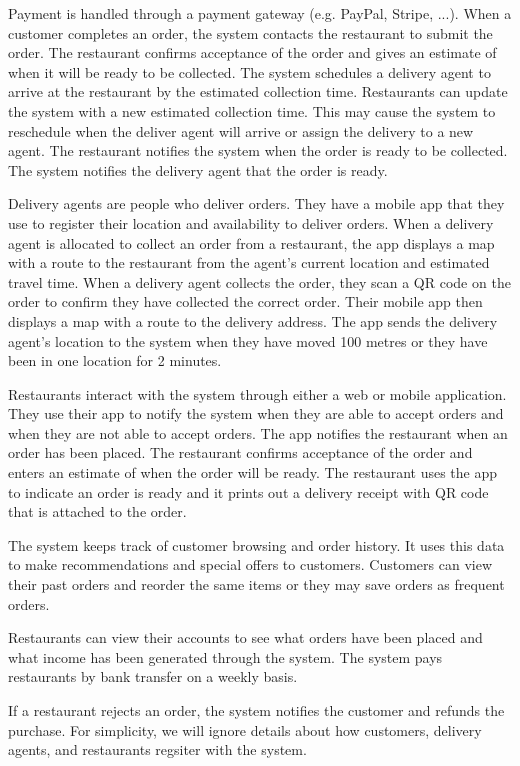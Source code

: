 \documentclass{csse4400}
\begin{document}
Payment is handled through a payment gateway (e.g. PayPal, Stripe, ...).
When a customer completes an order, the system contacts the restaurant to submit the order.
The restaurant confirms acceptance of the order and gives an estimate of when it will be ready to be collected.
The system schedules a delivery agent to arrive at the restaurant by the estimated collection time.
Restaurants can update the system with a new estimated collection time.
This may cause the system to reschedule when the deliver agent will arrive or assign the delivery to a new agent.
The restaurant notifies the system when the order is ready to be collected.
The system notifies the delivery agent that the order is ready.

Delivery agents are people who deliver orders.
They have a mobile app that they use to register their location and availability to deliver orders.
When a delivery agent is allocated to collect an order from a restaurant, the app displays a map with a route to the restaurant from the agent's current location and estimated travel time.
When a delivery agent collects the order, they scan a QR code on the order to confirm they have collected the correct order.
Their mobile app then displays a map with a route to the delivery address.
The app sends the delivery agent's location to the system when they have moved 100 metres or they have been in one location for 2 minutes.

Restaurants interact with the system through either a web or mobile application.
They use their app to notify the system when they are able to accept orders and when they are not able to accept orders.
The app notifies the restaurant when an order has been placed.
The restaurant confirms acceptance of the order and enters an estimate of when the order will be ready.
The restaurant uses the app to indicate an order is ready and it prints out a delivery receipt with QR code that is attached to the order.

The system keeps track of customer browsing and order history.
It uses this data to make recommendations and special offers to customers.
Customers can view their past orders and reorder the same items or they may save orders as frequent orders.

Restaurants can view their accounts to see what orders have been placed and what income has been generated through the system.
The system pays restaurants by bank transfer on a weekly basis.

If a restaurant rejects an order, the system notifies the customer and refunds the purchase.
For simplicity, we will ignore details about how customers, delivery agents, and restaurants regsiter with the system.
\end{document}

